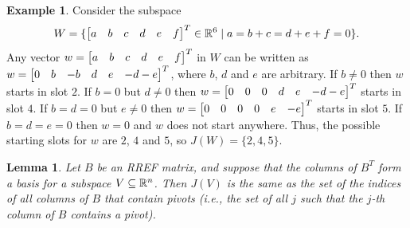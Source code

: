 \documentclass[reqno]{amsart}
\newtheorem{lemma}[theorem]{Lemma}
\theoremstyle{definition}
\newtheorem{example}[theorem]{Example}
\begin{document}
\begin{example}\label{eg-jumps-ii}
 Consider the subspace
 \[ W = \{\left[\begin{matrix} a&b&c&d&e&f\end{matrix}\right]^T\in{\mathbb{R}}^6\;|\; a=b+c=d+e+f=0\}. \]
 Any vector $w=\left[\begin{matrix} a&b&c&d&e&f\end{matrix}\right]^T$ in $W$ can be written as
 $w=\left[\begin{matrix} 0&b&-b&d&e&-d-e\end{matrix}\right]^T$, where $b$, $d$ and $e$ are
 arbitrary.  If $b\neq 0$ then $w$ starts in slot $2$.  If $b=0$ but
 $d\neq 0$ then $w=\left[\begin{matrix} 0&0&0&d&e&-d-e\end{matrix}\right]^T$ starts in slot $4$.  If
 $b=d=0$ but $e\neq 0$ then $w=\left[\begin{matrix} 0&0&0&0&e&-e\end{matrix}\right]^T$ starts in slot
 $5$.  If $b=d=e=0$ then $w=0$ and $w$ does not start anywhere.  Thus,
 the possible starting slots for $w$ are $2$, $4$ and $5$, so
 $J(W)=\{2,4,5\}$.
\end{example}

\begin{lemma}\label{lem-jumps-pivots}
 Let $B$ be an RREF matrix, and suppose that the columns of $B^T$ form
 a basis for a subspace $V\subseteq{\mathbb{R}}^n$.  Then $J(V)$ is the same as the
 set of the indices of all columns of $B$ that contain pivots
 (i.e., the set of all $j$ such that the $j$-th column of $B$ contains
 a pivot).
\end{lemma}
\end{document}
